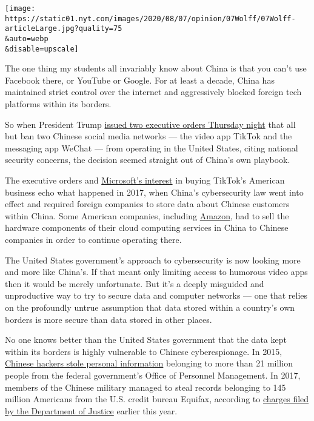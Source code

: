 \texttt{[image: https://static01.nyt.com/images/2020/08/07/opinion/07Wolff/07Wolff-articleLarge.jpg?quality=75\\\&auto=webp\\\&disable=upscale]}

The one thing my students all invariably know about China is that you
can't use Facebook there, or YouTube or Google. For at least a decade,
China has maintained strict control over the internet and aggressively
blocked foreign tech platforms within its borders.

So when President Trump
\href{https://www.nytimes.com/2020/08/06/technology/trump-wechat-tiktok-china.html}{issued
two executive orders Thursday night} that all but ban two Chinese social
media networks --- the video app TikTok and the messaging app WeChat ---
from operating in the United States, citing national security concerns,
the decision seemed straight out of China's own playbook.

The executive orders and
\href{https://blogs.microsoft.com/blog/2020/08/02/microsoft-to-continue-discussions-on-potential-tiktok-purchase-in-the-united-states/}{Microsoft's
interest} in buying TikTok's American business echo what happened in
2017, when China's cybersecurity law went into effect and required
foreign companies to store data about Chinese customers within China.
Some American companies, including
\href{https://www.wsj.com/articles/amazon-to-sell-its-china-cloud-computing-business-1510628802}{Amazon},
had to sell the hardware components of their cloud computing services in
China to Chinese companies in order to continue operating there.

The United States government's approach to cybersecurity is now looking
more and more like China's. If that meant only limiting access to
humorous video apps then it would be merely unfortunate. But it's a
deeply misguided and unproductive way to try to secure data and computer
networks --- one that relies on the profoundly untrue assumption that
data stored within a country's own borders is more secure than data
stored in other places.

No one knows better than the United States government that the data kept
within its borders is highly vulnerable to Chinese cyberespionage. In
2015,
\href{https://www.nytimes.com/2015/07/10/us/office-of-personnel-management-hackers-got-data-of-millions.html}{Chinese
hackers stole personal information} belonging to more than 21 million
people from the federal government's Office of Personnel Management. In
2017, members of the Chinese military managed to steal records belonging
to 145 million Americans from the U.S. credit bureau Equifax, according
to
\href{https://www.justice.gov/opa/press-release/file/1246891/download}{charges
filed by the Department of Justice} earlier this year.

